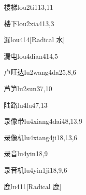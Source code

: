 \begin{verbete}{楼梯}{lou2ti1}{13,11}
\end{verbete}

\begin{verbete}{楼下}{lou2xia4}{13,3}
\end{verbete}

\begin{verbete}{漏}{lou4}{14}[Radical 水]
\end{verbete}

\begin{verbete}{漏电}{lou4dian4}{14,5}
\end{verbete}

\begin{verbete}{卢旺达}{lu2wang4da2}{5,8,6}
\end{verbete}

\begin{verbete}{芦笋}{lu2sun3}{7,10}
\end{verbete}

\begin{verbete}{陆路}{lu4lu4}{7,13}
\end{verbete}

\begin{verbete}{录像带}{lu4xiang4dai4}{8,13,9}
\end{verbete}

\begin{verbete}{录像机}{lu4xiang4ji1}{8,13,6}
\end{verbete}

\begin{verbete}{录音}{lu4yin1}{8,9}
\end{verbete}

\begin{verbete}{录音机}{lu4yin1ji1}{8,9,6}
\end{verbete}

\begin{verbete}{鹿}{lu4}{11}[Radical 鹿]
\end{verbete}

